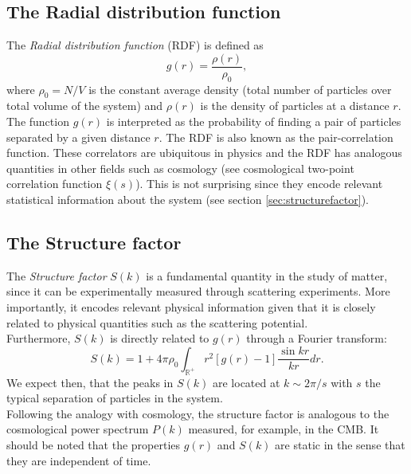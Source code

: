 \documentclass[%
aps,
pra,%
amsmath,amssymb,
preprint,%
reprint,%
notitlepage,
a4paper]{revtex4-1}
\begin{document}
\subsection{The Radial distribution function}
The \textit{Radial distribution function} (RDF) is defined as
\begin{equation}
g(r) = \frac{\rho(r)}{\rho_0},
\end{equation}
where $\rho_0 = N/V$ is the constant average density (total number of particles over total volume of the system) and $\rho(r)$ is the density of particles at a distance $r$. The function $g(r)$ is interpreted as the probability of finding a pair of particles separated by a given distance $r$. The RDF is also known as the pair-correlation function. These correlators are ubiquitous in physics and the RDF has analogous quantities in other fields such as cosmology (see cosmological two-point correlation function $\xi(s)$\cite{Peebles1980}). This is not surprising since they encode relevant statistical information about the system (see section \ref{sec:structurefactor}).\\
\subsection{The Structure factor \label{sec:structurefactor}}
The \textit{Structure factor} $S(k)$ is a fundamental quantity in the study of matter, since it can be experimentally measured through scattering experiments\cite{Simon2013}. More importantly, it encodes relevant physical information given that it is closely related to physical quantities such as the scattering potential.\\
Furthermore, $S(k)$ is directly related to $g(r)$ through a Fourier transform:
\begin{equation}
S(k) = 1 + 4\pi\rho_0\int_{\mathbb{R}^+}r^2 [g(r) - 1] \frac{\sin kr}{kr} dr.
\label{eq:sofk}
\end{equation}
We expect then, that the peaks in $S(k)$ are located at $k\sim 2\pi/s$ with $s$ the typical separation of particles in the system.\\
Following the analogy with cosmology, the structure factor is analogous to the cosmological power spectrum $P(k)$ measured, for example, in the CMB\cite{Peebles1980}.
It should be noted that the properties $g(r)$ and $S(k)$ are static in the sense that they are independent of time.
\end{document}
